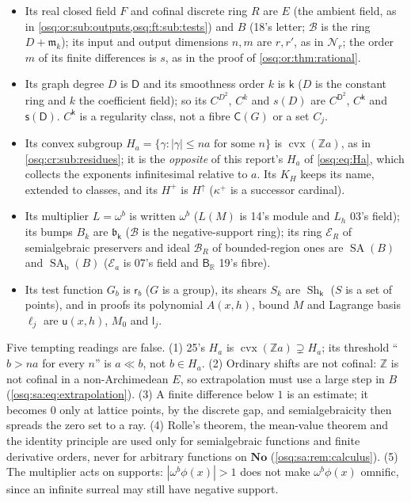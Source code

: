 \documentclass[11pt,letterpaper]{article}
\numberwithin{equation}{section}
\theoremstyle{definition}
\theoremstyle{remark}
\theoremstyle{plain}
\newcommand{\No}{\mathbf{No}}
\newcommand{\Z}{\mathbb Z}
\newcommand{\R}{\mathbb R}
\newcommand{\B}{\mathcal B}          %
\newcommand{\mm}{\mathfrak m}        %
\newcommand{\EE}{\mathscr E}         %
\newcommand{\Num}{\mathscr N}
\begin{document}
\begin{itemize}
\item Its real closed field $F$ and cofinal discrete ring $R$ are $E$ (the ambient field, as in \cref{osq:or:sub:outputs,osq:ft:sub:tests}) and $B$ (18's
letter; $\B$ is the ring $D+\mm_k$); its input and output dimensions $n,m$ are $r,r'$, as in $\Num_r$; the order $m$ of its finite differences is $s$, as in
the proof of \cref{osq:or:thm:rational}.
\item Its graph degree $D$ is $\mathsf D$ and its smoothness order $k$ is $\mathsf k$ ($D$ is the constant ring and $k$ the coefficient field); so its
$C^{D^2}$, $C^k$ and $s(D)$ are $C^{\mathsf D^2}$, $C^{\mathsf k}$ and $\mathsf s(\mathsf D)$. $C^{\mathsf k}$ is a regularity class, not a fibre
$\mathsf C(G)$ or a set $C_j$.
\item Its convex subgroup $H_a=\{\gamma:|\gamma|\le na\text{ for some }n\}$ is $\operatorname{cvx}(\Z a)$, as in \cref{osq:cr:sub:residues}; it is the
\emph{opposite} of this report's $H_a$ of \eqref{osq:eq:Ha}, which collects the exponents infinitesimal relative to $a$. Its $K_H$ keeps its name,
extended to classes, and its $H^+$ is $H^{\uparrow}$ ($\kappa^+$ is a successor cardinal).
\item Its multiplier $L=\omega^b$ is written $\omega^b$ ($L(M)$ is 14's module and $L_h$ 03's field); its bumps $B_k$ are $\mathfrak b_{\mathsf k}$ ($\B$ is
the negative-support ring); its ring $\mathcal E_R$ of semialgebraic preservers and ideal $\mathcal B_R$ of bounded-region ones are $\operatorname{SA}(B)$
and $\operatorname{SA}_{\mathrm b}(B)$ ($\EE_a$ is 07's field and $\mathsf B_\R$ 19's fibre).
\item Its test function $G_b$ is $\mathsf r_b$ ($G$ is a group), its shears $S_k$ are $\operatorname{Sh}_{\mathsf k}$ ($S$ is a set of points), and in
proofs its polynomial $A(x,h)$, bound $M$ and Lagrange basis $\ell_j$ are $\mathsf u(x,h)$, $M_0$ and $\mathsf l_j$.
\end{itemize}
Five tempting readings are false. (1) 25's $H_a$ is $\operatorname{cvx}(\Z a)\supsetneq H_a$; its threshold ``$b>na$ for every $n$'' is $a\ll b$, not
$b\in H_a$. (2) Ordinary shifts are not cofinal: $\Z$ is not cofinal in a non-Archimedean $E$, so extrapolation must use a large step in $B$
(\eqref{osq:sa:eq:extrapolation}). (3) A finite difference below $1$ is an estimate; it becomes $0$ only at lattice points, by the discrete gap, and
semialgebraicity then spreads the zero set to a ray. (4) Rolle's theorem, the mean-value theorem and the identity principle are used only for
semialgebraic functions and finite derivative orders, never for arbitrary functions on $\No$ (\cref{osq:sa:rem:calculus}). (5) The multiplier acts on
supports: $|\omega^b\phi(x)|>1$ does not make $\omega^b\phi(x)$ omnific, since an infinite surreal may still have negative support.
\end{document}
